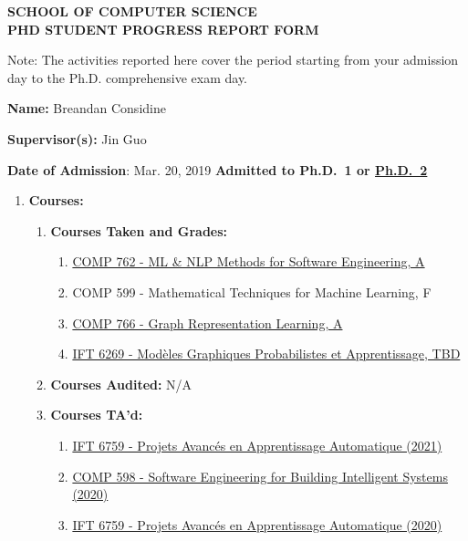 \documentclass[11pt]{article}
\begin{document}
    \begin{center}
        \large {\bf SCHOOL OF COMPUTER SCIENCE \\ PHD STUDENT PROGRESS REPORT FORM}
    \end{center}

    Note: The activities reported here cover the period starting
    from your admission day to the Ph.D. comprehensive exam day.
    \medskip

    \textbf{Name:} Breandan Considine

    \textbf{Supervisor(s):} Jin Guo

    \textbf{Date of Admission}: Mar. 20, 2019
    \hspace{45mm}
    \textbf{Admitted to Ph.D.\ 1 or \underline{Ph.D.\ 2}}

    \begin{enumerate}
        \item \textbf{Courses:}
        \begin{enumerate}
            \item \textbf{Courses Taken and Grades:}

            \begin{enumerate}
                \item \href{https://www.cs.mcgill.ca/~cs762/}{COMP 762 - ML \& NLP Methods for Software Engineering, A}
                \item COMP 599 - Mathematical Techniques for Machine Learning, F
                \item \href{https://cs.mcgill.ca/~wlh/comp766/}{COMP 766 - Graph Representation Learning, A}
                \item \href{http://www.iro.umontreal.ca/~slacoste/teaching/ift6269/A20/}{IFT 6269 - Mod\`eles Graphiques Probabilistes et Apprentissage, TBD}
            \end{enumerate}

            \item \textbf{Courses Audited:} N/A

            \item \textbf{Courses TA'd:}

            \begin{enumerate}
                \item \href{https://admission.umontreal.ca/cours-et-horaires/cours/IFT-6759/}{IFT 6759 - Projets Avanc\'es en Apprentissage Automatique (2021)}
                \item \href{https://github.com/jin-guo/COMP598_Fall2020}{COMP 598 - Software Engineering for Building Intelligent Systems (2020)}
                \item \href{https://admission.umontreal.ca/cours-et-horaires/cours/IFT-6759/}{IFT 6759 - Projets Avanc\'es en Apprentissage Automatique (2020)}
            \end{enumerate}


\end{enumerate}
\end{enumerate}
\end{document}
